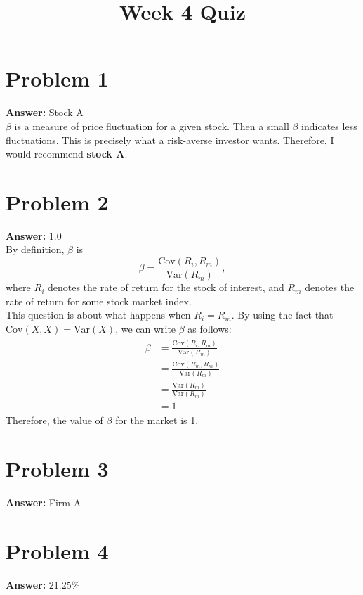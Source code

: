 \documentclass[11pt]{article}
\date{}
\title{Week 4 Quiz}
\begin{document}
\thispagestyle{empty}
\pagestyle{empty}
\section*{Problem 1}
\label{sec:org79c82ef}

\textbf{Answer:} Stock A\\

\(\beta\) is a measure of price fluctuation for a given stock. Then a small
\(\beta\) indicates less fluctuations. This is precisely what a risk-averse
investor wants. Therefore, I would recommend \textbf{stock A}.
\section*{Problem 2}
\label{sec:org82376db}

\textbf{Answer:} 1.0\\

By definition, \(\beta\) is
\begin{equation}
\beta=\frac{\mathrm{Cov}(R_i,R_m)}{\mathrm{Var}(R_m)},
\end{equation}
where \(R_i\) denotes the rate of return for the stock of interest, and \(R_m\)
denotes the rate of return for some stock market index.\\
This question is about what happens when \(R_i=R_m\). By using the fact that
\(\mathrm{Cov}(X,X)=\mathrm{Var}(X)\), we can write \(\beta\) as follows:
\begin{align}
  \begin{split}
    \beta&=\frac{\mathrm{Cov}(R_i,R_m)}{\mathrm{Var}(R_m)}\\
    &=\frac{\mathrm{Cov}(R_m,R_m)}{\mathrm{Var}(R_m)}\\
    &=\frac{\mathrm{Var}(R_m)}{\mathrm{Var}(R_m)}\\
    &=1.
  \end{split}
\end{align}
Therefore, the value of \(\beta\) for the market is 1.
\section*{Problem 3}
\label{sec:org852ff12}

\textbf{Answer:} Firm A
\section*{Problem 4}
\label{sec:org4af14bb}

\textbf{Answer:} 21.25\%\\
\end{document}
